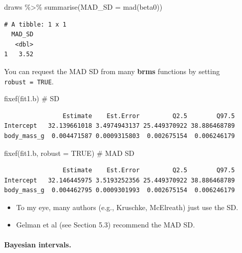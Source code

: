 \documentclass[
  letterpaper,
  DIV=11,
  numbers=noendperiod]{scrartcl}
\let\oldparagraph\paragraph
\renewcommand{\paragraph}[1]{\oldparagraph{#1}\mbox{}}
\newenvironment{Shaded}{\begin{snugshade}}{\end{snugshade}}
\newcommand{\AttributeTok}[1]{\textcolor[rgb]{0.40,0.45,0.13}{#1}}
\newcommand{\CommentTok}[1]{\textcolor[rgb]{0.37,0.37,0.37}{#1}}
\newcommand{\ConstantTok}[1]{\textcolor[rgb]{0.56,0.35,0.01}{#1}}
\newcommand{\FunctionTok}[1]{\textcolor[rgb]{0.28,0.35,0.67}{#1}}
\newcommand{\NormalTok}[1]{\textcolor[rgb]{0.00,0.23,0.31}{#1}}
\newcommand{\SpecialCharTok}[1]{\textcolor[rgb]{0.37,0.37,0.37}{#1}}
\providecommand{\tightlist}{%
  \setlength{\itemsep}{0pt}\setlength{\parskip}{0pt}}\usepackage{longtable,booktabs,array}
\begin{document}
\begin{Shaded}
\begin{Highlighting}[]
\NormalTok{draws }\SpecialCharTok{\%\textgreater{}\%} 
  \FunctionTok{summarise}\NormalTok{(}\AttributeTok{MAD\_SD =} \FunctionTok{mad}\NormalTok{(beta0))}
\end{Highlighting}
\end{Shaded}

\begin{verbatim}
# A tibble: 1 x 1
  MAD_SD
   <dbl>
1   3.52
\end{verbatim}

You can request the MAD SD from many \textbf{brms} functions by setting
\texttt{robust\ =\ TRUE}.

\begin{Shaded}
\begin{Highlighting}[]
\FunctionTok{fixef}\NormalTok{(fit1.b)                 }\CommentTok{\# SD}
\end{Highlighting}
\end{Shaded}

\begin{verbatim}
                Estimate    Est.Error         Q2.5        Q97.5
Intercept   32.139661018 3.4974943137 25.449370922 38.886468789
body_mass_g  0.004471587 0.0009315803  0.002675154  0.006246179
\end{verbatim}

\begin{Shaded}
\begin{Highlighting}[]
\FunctionTok{fixef}\NormalTok{(fit1.b, }\AttributeTok{robust =} \ConstantTok{TRUE}\NormalTok{)  }\CommentTok{\# MAD SD}
\end{Highlighting}
\end{Shaded}

\begin{verbatim}
                Estimate    Est.Error         Q2.5        Q97.5
Intercept   32.146445975 3.5193252356 25.449370922 38.886468789
body_mass_g  0.004462795 0.0009301993  0.002675154  0.006246179
\end{verbatim}

\begin{itemize}
\tightlist
\item
  To my eye, many authors (e.g., Kruschke, McElreath) just use the SD.
\item
  Gelman et al (see Section 5.3) recommend the MAD SD.
\end{itemize}

\paragraph{Bayesian intervals.}\label{bayesian-intervals.}
\end{document}

